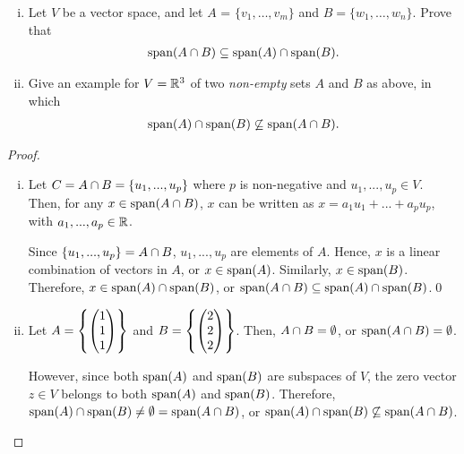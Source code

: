 \begin{question}\label{que:SpanIntersection}
    \normalfont

    \begin{enumerate}[(i)]
        \item Let $V$ be a vector space, and let $A$ = $\{v_1,\dots, v_m\}$ and $B=\{ w_1, \dots, w_n\}$.  Prove that
              \begin{align*}
                  \textnormal{span}(A\cap B) \subseteq \textnormal{span}(A)\cap\textnormal{span}(B).
              \end{align*}


        \item Give an example for $V={\mathbb R}^3$ of two \emph{non-empty} sets $A$ and $B$ as above, in which
              \begin{align*}
                  \textnormal{span}(A)\cap \textnormal{span}(B) \not\subseteq \textnormal{span}(A\cap B).
              \end{align*}


    \end{enumerate}
\end{question}

\begin{proof}
    \begin{enumerate}[(i)]
        \renewcommand{\qedsymbol}{$\blacksquare$}
        \item Let $C=A\cap B=\{u_1,...,u_p\}$ where $p$ is non-negative and $u_1,...,u_p\in V$.
        Then, for any $x\in\textnormal{span}(A\cap B)$, $x$ can be written as $x=a_1u_1+...+a_pu_p$, with $a_1,...,a_p\in\mathbb R$. 

        Since $\{u_1,...,u_p\}=A\cap B$, $u_1,...,u_p$ are elements of $A$. Hence, $x$ is a linear combination of vectors in $A$, or $x\in\textnormal{span}(A)$.
        Similarly, $x\in\textnormal{span}(B)$. Therefore, $x\in\textnormal{span}(A)\cap\textnormal{span}(B)$, or $\textnormal{span}(A\cap B)\subseteq\textnormal{span}(A)\cap\textnormal{span}(B)$.\qed
        \item Let $A=\left\{ \begin{pmatrix} 1\\ 1\\ 1\end{pmatrix}\right \}$ and $B=\left\{\begin{pmatrix} 2\\ 2\\ 2\end{pmatrix}\right\}$. Then, $A\cap B=\emptyset$, or $\textnormal{span}(A\cap B)=\emptyset$.
        
        However, since both $\textnormal{span}(A)$ and $\textnormal{span}(B)$ are subspaces of $V$, the zero vector $z\in V$ belongs to both $\textnormal{span}(A)$ and $\textnormal{span}(B)$. Therefore, $\textnormal{span}(A)\cap\textnormal{span}(B)\not=\emptyset=\textnormal{span}(A\cap B)$, or $\textnormal{span}(A)\cap\textnormal{span}(B)\not\subseteq\textnormal{span}(A\cap B)$.
    \end{enumerate}
\end{proof}